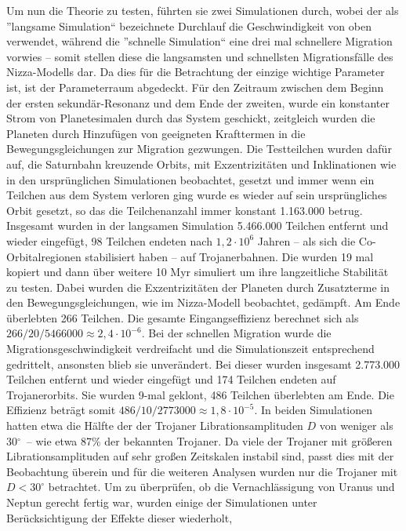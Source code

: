 \documentclass[12pt,a4paper,twoside]{article}
\newcommand{\degree}{$^\circ$}
\begin{document}
Um nun die Theorie zu testen, führten sie zwei Simulationen durch,
wobei der als ''langsame Simulation`` bezeichnete Durchlauf die Geschwindigkeit von oben verwendet, während die ''schnelle Simulation`` eine drei mal schnellere Migration vorwies – somit stellen diese die langsamsten und schnellsten Migrationsfälle des Nizza-Modells dar. Da dies für die Betrachtung der einzige wichtige Parameter ist, ist der Parameterraum abgedeckt. %
Für den Zeitraum zwischen dem Beginn der ersten sekundär-Resonanz und dem Ende der zweiten, wurde ein konstanter Strom von Planetesimalen durch das System geschickt,
zeitgleich wurden die Planeten durch Hinzufügen von geeigneten Krafttermen in die Bewegungsgleichungen zur Migration gezwungen.
Die Testteilchen wurden dafür auf, die Saturnbahn kreuzende Orbits, mit Exzentrizitäten und Inklinationen wie in den ursprünglichen Simulationen beobachtet, gesetzt und immer wenn ein Teilchen aus dem System verloren ging wurde es wieder auf sein ursprüngliches Orbit gesetzt, so das die Teilchenanzahl immer konstant 1.163.000 betrug.
Insgesamt wurden in der langsamen Simulation 5.466.000 Teilchen entfernt und wieder eingefügt, 98 Teilchen endeten nach $1,2 \cdot 10^6$ Jahren – als sich die Co-Orbitalregionen stabilisiert haben – auf Trojanerbahnen.
Die wurden 19 mal kopiert %
 und dann über weitere 10 Myr simuliert um ihre langzeitliche Stabilität zu testen.
Dabei wurden die Exzentrizitäten der Planeten durch Zusatzterme in den Bewegungsgleichungen, wie im Nizza-Modell beobachtet, gedämpft. Am Ende überlebten 266 Teilchen. Die gesamte Eingangseffizienz berechnet sich als $266/20/5466000 \approx 2,4 \cdot 10^{-6}$.
Bei der schnellen Migration wurde die Migrationsgeschwindigkeit verdreifacht und die Simulationszeit entsprechend gedrittelt, ansonsten blieb sie unverändert.
Bei dieser wurden insgesamt 2.773.000 Teilchen entfernt und wieder eingefügt und 174 Teilchen endeten auf Trojanerorbits. Sie wurden 9-mal geklont, 486 Teilchen überlebten am Ende.
Die Effizienz beträgt somit $486/10/2773000 \approx 1,8 \cdot 10^{-5}$.
In beiden Simulationen hatten etwa die Hälfte der der Trojaner Librationsamplituden $D$ von weniger als 30\degree\ – wie etwa 87\% der bekannten Trojaner.
Da viele der Trojaner mit größeren Librationsamplituden auf sehr großen Zeitskalen instabil sind, passt dies mit der Beobachtung überein und für die weiteren Analysen wurden nur die Trojaner mit $D<30^\circ$ betrachtet. %
Um zu überprüfen, ob die Vernachlässigung von Uranus und Neptun gerecht fertig %
war, wurden einige der Simulationen unter Berücksichtigung der Effekte dieser wiederholt, %
\end{document}
